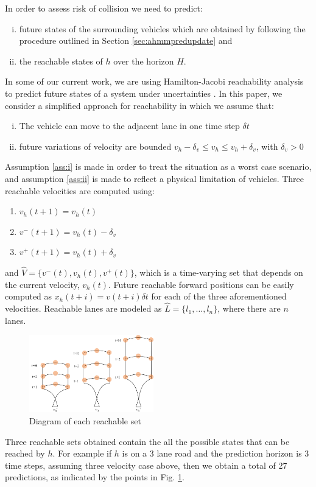 \documentclass[letterpaper, 10 pt, conference]{ieeeconf}  %
\newcommand\NB[1]{$\spadesuit$\footnote{NB: #1}}
\newcommand\RP[1]{$\clubsuit$\footnote{RP: #1}}
\begin{document}
In order to assess risk of collision we need to predict:
\begin{enumerate}[i.]
\item future states of the surrounding vehicles which are obtained by following the procedure outlined in Section \ref{sec:ahmmpredupdate} and
\item the reachable states of $h$ over the horizon $H$.
\end{enumerate}
In some of our current work, we are using Hamilton-Jacobi reachability analysis to predict future states of a system under uncertainties \cite{esen}. In this paper, we consider a simplified approach for reachability in which we assume that:
\begin{enumerate}[i.]
\item The vehicle can move to the adjacent lane in one time step $\delta t$ \label{ass:i}
\item future variations of velocity are bounded $v_h-\delta_v \leq v_h\leq v_h+\delta_v$, with $\delta_v>0$ \label{ass:ii}
\end{enumerate}
Assumption \ref{ass:i} is made in order to treat the situation as a worst case scenario, and assumption \ref{ass:ii} is made to reflect a physical limitation of vehicles.
Three reachable velocities are computed using:
\begin{enumerate} %
    \item $v_h(t+1)=v_h(t)$
    \item $v^-(t+1)=v_h(t)-\delta_v$
    \item $v^+(t+1)=v_h(t)+\delta_v$
\end{enumerate} 
and $\hat{V} = \{v^-(t),v_h(t),v^+(t)\}$, which is a time-varying set that depends on the current velocity, $v_h(t)$. Future reachable forward positions can be easily computed as $x_h(t+i)=v(t+i)\delta t$ for each of the three aforementioned velocities. Reachable lanes are modeled as $\hat{L} = \{l_1,\ldots,l_n\}$, where there are $n$ lanes. 
\begin{figure}[ht!]
    \includegraphics[width=0.48\textwidth]{fig/input.png}
    \caption{Diagram of each reachable set}
    \label{fig:reach}
\end{figure}
Three reachable sets obtained contain the all the possible states that can be reached by $h$. For example if $h$ is on a 3 lane road and the prediction horizon is 3 time steps, assuming three velocity case above, then we obtain a total of 27 predictions, as indicated by the points in Fig. \ref{fig:reach}.
\end{document}
